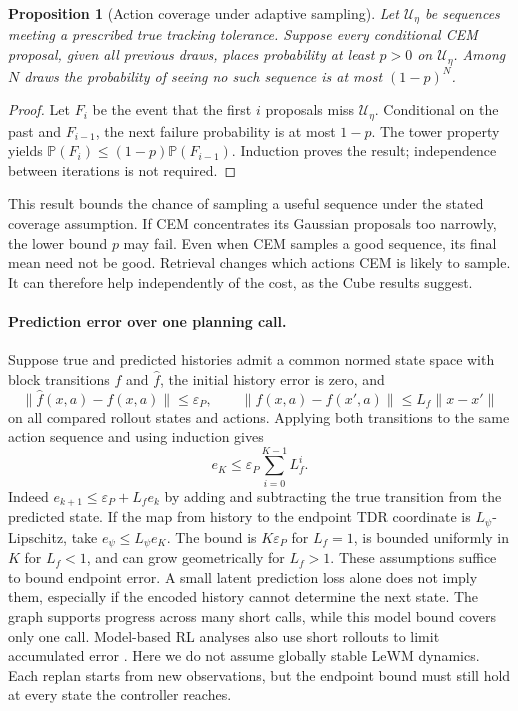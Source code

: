 \documentclass{article}
\newcommand{\PP}{\mathbb P}
\newtheorem{proposition}[theorem]{Proposition}
\theoremstyle{definition}
\theoremstyle{remark}
\begin{document}
\begin{proposition}[Action coverage under adaptive sampling]
\label{prop:coverage}
Let $\mathcal U_\eta$ be sequences meeting a prescribed true tracking tolerance.
Suppose every conditional CEM proposal, given all previous draws, places probability
at least $p>0$ on $\mathcal U_\eta$. Among $N$ draws the probability of seeing no such
sequence is at most $(1-p)^N$.
\end{proposition}
\begin{proof}
Let $F_i$ be the event that the first $i$ proposals miss $\mathcal U_\eta$.
Conditional on the past and $F_{i-1}$, the next failure probability is at most $1-p$.
The tower property yields $\PP(F_i)\le(1-p)\PP(F_{i-1})$.
Induction proves the result; independence between iterations is not required.
\end{proof}
This result bounds the chance of sampling a useful sequence under the stated coverage assumption.
If CEM concentrates its Gaussian proposals too narrowly, the lower bound $p$ may fail.
Even when CEM samples a good sequence, its final mean need not be good.
Retrieval changes which actions CEM is likely to sample. It can therefore help
independently of the cost, as the Cube results suggest.

\paragraph{Prediction error over one planning call.}
Suppose true and predicted histories admit a common normed state
space with block transitions $f$ and $\hat f$, the initial history error is zero, and
\[
 \|\hat f(x,a)-f(x,a)\|\le\varepsilon_P,\qquad
 \|f(x,a)-f(x',a)\|\le L_f\|x-x'\|
\]
on all compared rollout states and actions. Applying both transitions to the same
action sequence and using induction gives
\begin{equation}
 e_K\le\varepsilon_P\sum_{i=0}^{K-1}L_f^i .
 \label{eq:rollout-error}
\end{equation}
Indeed $e_{k+1}\le\varepsilon_P+L_fe_k$ by adding and subtracting the true transition
from the predicted state. If the map from history to the endpoint TDR coordinate
is $L_\psi$-Lipschitz, take $e_\psi\le L_\psi e_K$.
The bound is $K\varepsilon_P$ for $L_f=1$, is bounded uniformly in $K$ for
$L_f<1$, and can grow geometrically for $L_f>1$.
These assumptions suffice to bound endpoint error. A small latent prediction loss
alone does not imply them, especially if the encoded history cannot determine the next state.
The graph supports progress across many short calls, while this model bound covers
only one call. Model-based RL analyses also use short rollouts to limit accumulated
error \citep{mbpo}. Here we do not assume globally stable LeWM dynamics.
Each replan starts from new observations, but the endpoint bound must still hold
at every state the controller reaches.
\end{document}
